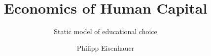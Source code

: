 

\title{Economics of Human Capital}
\subtitle{\vspace{0.3cm}Static model of educational choice}
\author{Philipp Eisenhauer}

\date{}

\let\otp\titlepage
